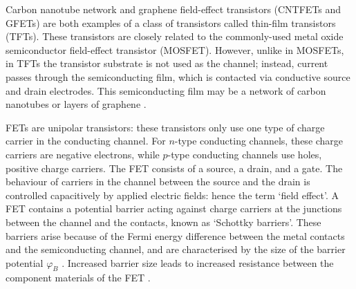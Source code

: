 \documentclass[
  a4paper,
]{scrbook}
\begin{document}
Carbon nanotube network and graphene field-effect transistors (CNTFETs
and GFETs) are both examples of a class of transistors called thin-film
transistors (TFTs). These transistors are closely related to the
commonly-used metal oxide semiconductor field-effect transistor
(MOSFET). However, unlike in MOSFETs, in TFTs the transistor substrate
is not used as the channel; instead, current passes through the
semiconducting film, which is contacted via conductive source and drain
electrodes. This semiconducting film may be a network of carbon
nanotubes or layers of graphene \autocite{Sun2013}.

FETs are unipolar transistors: these transistors only use one type of
charge carrier in the conducting channel. For \(n\)-type conducting
channels, these charge carriers are negative electrons, while \(p\)-type
conducting channels use holes, positive charge carriers. The FET
consists of a source, a drain, and a gate. The behaviour of carriers in
the channel between the source and the drain is controlled capacitively
by applied electric fields: hence the term `field effect'. A FET
contains a potential barrier acting against charge carriers at the
junctions between the channel and the contacts, known as `Schottky
barriers'. These barriers arise because of the Fermi energy difference
between the metal contacts and the semiconducting channel, and are
characterised by the size of the barrier potential \(φ_B\)
\autocite{Iijima1991}. Increased barrier size leads to increased
resistance between the component materials of the FET
\autocite{Zheng2016}.
\end{document}
